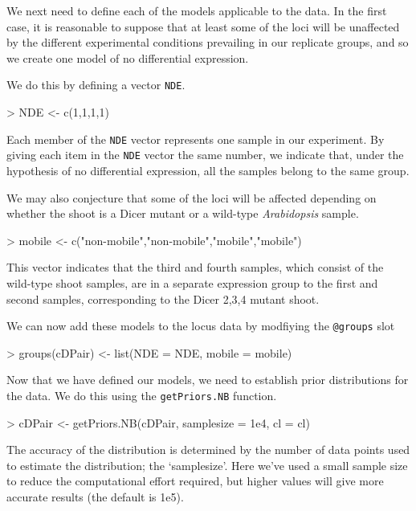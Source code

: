 \documentclass[a4paper]{article}
\begin{document}
We next need to define each of the models applicable to the data. In the first case, it is reasonable to suppose that at least some of the loci will be unaffected by the different experimental conditions prevailing in our replicate groups, and so we create one model of no differential expression. 

We do this by defining a vector \verb'NDE'.
\begin{Schunk}
\begin{Sinput}
> NDE <- c(1,1,1,1)
\end{Sinput}
\end{Schunk}
Each member of the \verb'NDE' vector represents one sample in our experiment. By giving each item in the \verb'NDE' vector the same number, we indicate that, under the hypothesis of no differential expression, all the samples belong to the same group.

We may also conjecture that some of the loci will be affected depending on whether the shoot is a Dicer mutant or a wild-type \textsl{Arabidopsis} sample.
\begin{Schunk}
\begin{Sinput}
> mobile <- c("non-mobile","non-mobile","mobile","mobile")
\end{Sinput}
\end{Schunk}
This vector indicates that the third and fourth samples, which consist of the wild-type shoot samples, are in a separate expression group to the first and second samples, corresponding to the Dicer 2,3,4 mutant shoot.

We can now add these models to the locus data by modfiying the \verb'@groups' slot
\begin{Schunk}
\begin{Sinput}
> groups(cDPair) <- list(NDE = NDE, mobile = mobile)
\end{Sinput}
\end{Schunk}

Now that we have defined our models, we need to establish prior distributions for the data. We do this using the \verb'getPriors.NB' function.

\begin{Schunk}
\begin{Sinput}
> cDPair <- getPriors.NB(cDPair, samplesize = 1e4, cl = cl)
\end{Sinput}
\end{Schunk}


The accuracy of the distribution is determined by the number of data points used to estimate the distribution; the `samplesize'. Here we've used a small sample size to reduce the computational effort required, but higher values will give more accurate results (the default is 1e5).
\end{document}
